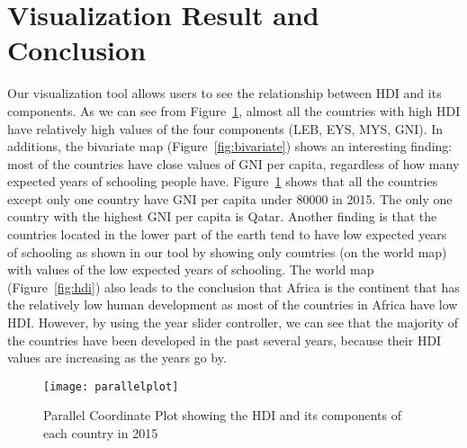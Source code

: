 \section{Visualization Result and Conclusion}
Our visualization tool allows users to see the relationship between HDI and its components. As we can see from Figure~\ref{fig:parallelplot}, almost all the countries with high HDI have relatively high values of the four components (LEB, EYS, MYS, GNI). In additions, the bivariate map (Figure~\ref{fig:bivariate}) shows an interesting finding: most of the countries have close values of GNI per capita, regardless of how many expected years of schooling people have. Figure~\ref{fig:parallelplot} shows that all the countries except only one country have GNI per capita under 80000 in 2015. The only one country with the highest GNI per capita is Qatar. Another finding is that the countries located in the lower part of the earth tend to have low expected years of schooling as shown in our tool by showing only countries (on the world map) with values of the low expected years of schooling. The world map (Figure~\ref{fig:hdi}) also leads to the conclusion that Africa is the continent that has the relatively low human development as most of the countries in Africa have low HDI. However, by using the year slider controller, we can see that the majority of the countries have been developed in the past several years, because their HDI values are increasing as the years go by. 

\begin{figure}[t]
    \centering
    \texttt{[image: parallelplot]}
    \caption{Parallel Coordinate Plot showing the HDI and its components of each country in 2015}
    \label{fig:parallelplot}
\end{figure}
